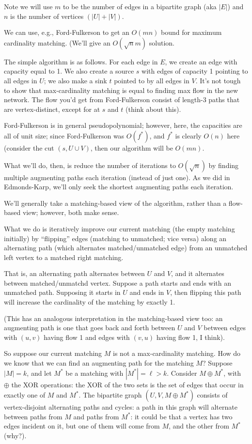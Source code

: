 \documentclass{article}
\begin{document}
Note we will use $m$ to be the number of edges in a bipartite graph (aka $|E|$)
and $n$ is the number of vertices $(|U| + |V|)$.

We can use, e.g., Ford-Fulkerson to get an $O(mn)$ bound for
maximum cardinality matching.
(We'll give an $O(\sqrt n m)$ solution.

The simple algorithm is as follows.
For each edge in $E$, we create an edge with capacity equal to 1.
We also create a source $s$ with edges of capacity 1 pointing to all edges
in $U$; we also make a sink $t$ pointed to by all edges in $V$.
It's not tough to show that max-cardinality matching is equal to finding
max flow in the new network.
The flow you'd get from Ford-Fulkerson consist of length-3 paths
that are vertex-distinct, except for at $s$ and $t$ (think about this).

Ford-Fulkerson is in general pseudopolynomial; however, here, the capacities
are all of unit size; since Ford-Fulkerson was $O(f^*)$, and $f^*$ is 
clearly $O(n)$ here (consider the cut $(s, U \cup V)$, then our algorithm will be $O(mn)$.

What we'll do, then, is reduce the number of iterations to $O(\sqrt n)$ by
finding multiple augmenting paths each iteration (instead of just one).
As we did in Edmonds-Karp, we'll only seek the shortest augmenting paths
each iteration.

We'll generally take a matching-based view of the algorithm, rather
than a flow-based view; however, both make sense.

What we do is iteratively improve our current matching (the empty matching
initially) by ``flipping'' edges (matching to unmatched; vice versa)
along an alternating path (which alternates matched/unmatched edge)
from an unmatched left vertex to a matched right matching.

That is, an alternating path alternates between $U$ and $V$, and it 
alternates between matched/unmatchd vertex.
Suppose a path starts and ends with an unmatched path. Supposing
it starts in $U$ and ends in $V$, then flipping this path will
increase the cardinality of the matching by exactly 1.

(This has an analogous interpretation in the matching-based view too:
an augmenting path is one that goes back and forth between $U$
and $V$ between edges with $(u,v)$ having flow 1 and edges with $(v,u)$ having
flow 1, I think).

So suppose our current matching $M$ is not a max-cardinality matching.
How do we know that we can find an augmenting path for the matching $M$?
Suppose $|M| = k$, and let $M^*$ be a matching with $|M^*| = \ell> k$.
Consider $M \oplus M^*$, with $\oplus$ the XOR operations: the XOR of the
two sets is the set of edges that occur in exactly one of $M$ and $M^*$.
The bipartite graph $(U,V,M\oplus M^*)$ consists of vertex-disjoint
alternating paths and cycles: a path in this graph will alternate
between paths from $M$ and paths from $M^*$: it could be that a vertex has
two edges incident on it, but one of them will come from $M$, and the other
from $M^*$ (why?).
\end{document}
